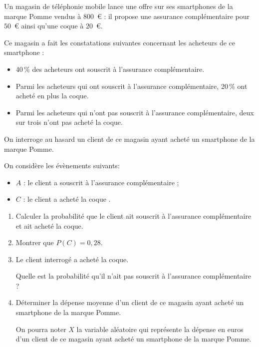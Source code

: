 \medskip
Un magasin de téléphonie mobile lance une offre sur ses smartphones de la marque Pomme vendus à $800$~\euro{} : il propose une assurance complémentaire pour $50$~\euro{} ainsi qu'une coque à $20$~\euro.

Ce magasin a fait les constatations suivantes concernant les acheteurs de ce smartphone :

\setlength\parindent{9mm}
\begin{itemize}
\item[$\bullet~~$] 40\,\% des acheteurs ont souscrit à l'assurance complémentaire.
\item[$\bullet~~$] Parmi les acheteurs qui ont souscrit à l'assurance complémentaire, 20\,\% ont acheté en plus la coque.
\item[$\bullet~~$] Parmi les acheteurs qui n'ont pas souscrit à l'assurance complémentaire, deux sur trois n'ont pas acheté la coque.
\end{itemize}
\setlength\parindent{0mm}

On interroge au hasard un client de ce magasin ayant acheté un smartphone de la marque Pomme.

On considère les évènements suivants:

\setlength\parindent{9mm}
\begin{itemize}
\item[$\bullet~~$]$A$ : \og le client a souscrit à l'assurance complémentaire \fg{} ;
\item[$\bullet~~$]$C$ : \og le client a acheté la coque \fg.
\end{itemize}
\setlength\parindent{0mm}

\medskip

\begin{enumerate}
\item Calculer la probabilité que le client ait souscrit à l'assurance complémentaire et ait acheté la coque.
\item Montrer que $P(C) = 0,28$.
\item Le client interrogé a acheté la coque.

Quelle est la probabilité qu'il n'ait pas souscrit à l'assurance complémentaire ? 
\item Déterminer la dépense moyenne d'un client de ce magasin ayant acheté un smartphone de la marque Pomme.

On pourra noter $X$ la variable aléatoire qui représente la dépense en euros d'un client de ce magasin ayant acheté un smartphone de la marque Pomme.
\end{enumerate}

\bigskip
